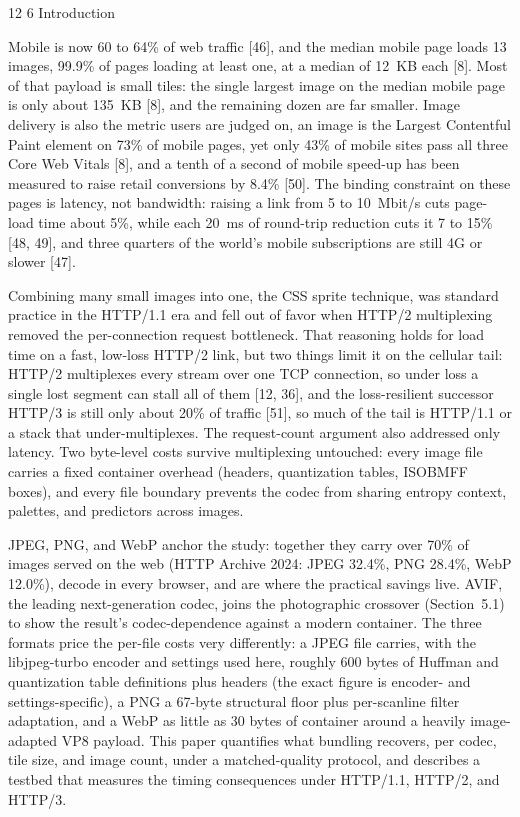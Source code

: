 \documentclass[3p,twocolumn]{elsarticle}
\makeatletter
\renewcommand\section{\@startsection{section}{1}{\z@}%
           {12\p@ \@plus 3\p@ \@minus 4\p@}%
           {6\p@ \@plus 2\p@ \@minus 2\p@}%
           {\normalsize\bfseries\boldmath}}
\makeatother
\begin{document}
\section{Introduction}

Mobile is now 60 to 64\% of web traffic [46], and the median mobile
page loads 13 images, 99.9\% of pages loading at least one, at a median
of 12~KB each [8]. Most of that payload is small tiles: the single
largest image on the median mobile page is only about 135~KB [8],
and the remaining dozen are far smaller. Image delivery is also the
metric users are judged on, an image is the Largest Contentful Paint
element on 73\% of mobile pages, yet only 43\% of mobile sites pass all
three Core Web Vitals [8], and a tenth of a second of mobile
speed-up has been measured to raise retail conversions by 8.4\%
[50]. The binding constraint on these pages is latency, not
bandwidth: raising a link from 5 to 10~Mbit/s cuts page-load time about
5\%, while each 20~ms of round-trip reduction cuts it 7 to 15\% [48,
49], and three quarters of the world's mobile
subscriptions are still 4G or slower [47].

Combining many small images into one, the CSS sprite technique, was
standard practice in the HTTP/1.1 era and fell out of favor when HTTP/2
multiplexing removed the per-connection request bottleneck. That
reasoning holds for load time on a fast, low-loss HTTP/2 link, but two
things limit it on the cellular tail: HTTP/2 multiplexes every stream
over one TCP connection, so under loss a single lost segment can stall
all of them [12, 36], and the loss-resilient successor HTTP/3 is
still only about 20\% of traffic [51], so much of the tail is
HTTP/1.1 or a stack that under-multiplexes. The request-count argument
also addressed only latency. Two byte-level costs survive multiplexing
untouched: every image file carries a fixed container overhead (headers,
quantization tables, ISOBMFF boxes), and every file boundary prevents
the codec from sharing entropy context, palettes, and predictors across
images.

JPEG, PNG, and WebP anchor the study: together they carry over 70\% of
images served on the web (HTTP Archive 2024: JPEG 32.4\%, PNG 28.4\%,
WebP 12.0\%), decode in every browser, and are where the practical
savings live. AVIF, the leading next-generation codec, joins the
photographic crossover (Section~5.1) to show the
result's codec-dependence against a modern container.
The three formats price the per-file costs very differently: a JPEG file
carries, with the libjpeg-turbo encoder and settings used here, roughly
600 bytes of Huffman and quantization table definitions plus headers
(the exact figure is encoder- and settings-specific), a PNG a 67-byte
structural floor plus per-scanline filter adaptation, and a WebP as
little as 30 bytes of container around a heavily image-adapted VP8
payload. This paper quantifies what bundling recovers, per codec, tile
size, and image count, under a matched-quality protocol, and describes a
testbed that measures the timing consequences under HTTP/1.1, HTTP/2,
and HTTP/3.
\end{document}
